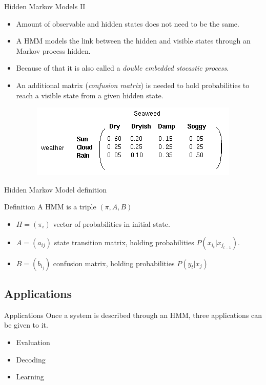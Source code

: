 \documentclass[xcolor=x11names,compress]{beamer}
\renewcommand{\(}{\begin{columns}}
\renewcommand{\)}{\end{columns}}
\newcommand{\<}[1]{\begin{column}{#1}}
\renewcommand{\>}{\end{column}}
\begin{document}
\begin{frame}{Hidden Markov Models II}
\begin{itemize}
	\item Amount of observable and hidden states does not need to be the same.
	\item A HMM models the link between the hidden and visible states through an Markov process hidden.
	\item Because of that it is also called a \emph{double embedded stocastic process}.
	\item An additional matrix (\emph{confusion matrix}) is needed to hold probabilities to reach a visible state from a given hidden state.
	\begin{figure}[tb]
	\centering
	\includegraphics[scale=0.7]{../report/resources/images/weather-confusion-matrix}
	\label{fig:matriz-confusion}
\end{figure}
\end{itemize}
\end{frame}

\begin{frame}{Hidden Markov Model definition}
\begin{block}{Definition}
A HMM is a triple $(\pi,A,B)$ 
\begin{itemize}
	\item $\Pi = (\pi _i)$ vector of probabilities in initial state.
	\item $A = ( a_{ij})$ state transition matrix, holding probabilities $P(x_{i_{t}} | x_{j_{t-1}})$.
	\item $B = (b_{i_{j}})$ confusion matrix, holding probabilities $P(y_t | x_j)$
\end{itemize}
\end{block}
\end{frame}

\subsection{Applications}
\begin{frame}{Applications}
Once a system is described through an HMM, three applications can be given to it.
\begin{itemize}
	\item Evaluation
	\item Decoding
	\item Learning
\end{itemize}
\end{frame}
\end{document}

